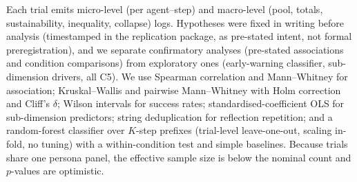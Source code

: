 \documentclass[runningheads]{llncs}
\begin{document}
Each trial emits micro-level (per agent--step) and macro-level (pool, totals, sustainability,
inequality, collapse) logs. Hypotheses were fixed in writing before analysis (timestamped in the
replication package, as pre-stated intent, not formal preregistration), and we separate
confirmatory analyses (pre-stated associations and condition comparisons) from exploratory ones
(early-warning classifier, sub-dimension drivers, all C5). We use Spearman correlation and
Mann--Whitney for association; Kruskal--Wallis and pairwise Mann--Whitney with Holm correction and
Cliff's $\delta$; Wilson intervals for success rates; standardised-coefficient OLS for
sub-dimension predictors; string deduplication for reflection repetition; and a random-forest
classifier over $K$-step prefixes (trial-level leave-one-out, scaling in-fold, no tuning) with a
within-condition test and simple baselines. Because trials share one persona panel, the effective
sample size is below the nominal count and $p$-values are optimistic.
\end{document}
